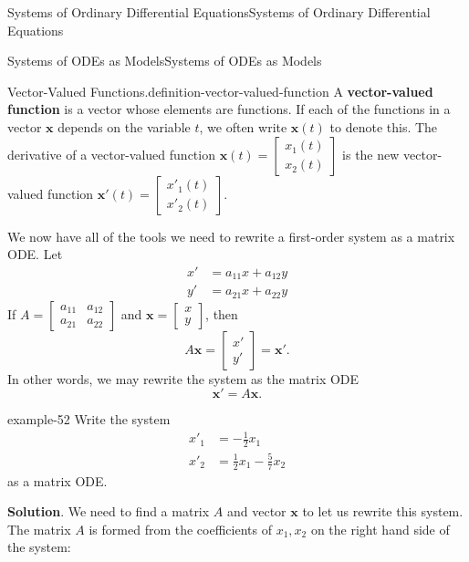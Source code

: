\documentclass[10pt,]{book}
\newcommand{\terminology}[1]{\textbf{#1}}
\numberwithin{equation}{section}
\renewcommand{\vec}[1]{\mathbf{#1}}
\newcommand{\amp}{&}
\begin{document}
\begin{chapterptx}{Systems of Ordinary Differential Equations}{}{Systems of Ordinary Differential Equations}{}{}
\begin{sectionptx}{Systems of ODEs as Models}{}{Systems of ODEs as Models}{}{}
\begin{definition}{Vector-Valued Functions.}{definition-vector-valued-function}
A \terminology{vector-valued function} is a vector whose elements are functions. If each of the functions in a vector \(\vec{x}\) depends on the variable \(t\), we often write \(\vec{x}(t)\) to denote this. The derivative of a vector-valued function \(\vec{x}(t) = \begin{bmatrix}x_{1}(t)\\x_{2}(t)\end{bmatrix}\) is the new vector-valued function \(\vec{x}'(t)=\begin{bmatrix}x'_{1}(t)\\x'_{2}(t)\end{bmatrix}\).%
\end{definition}
\hypertarget{p-316}{}%
We now have all of the tools we need to rewrite a first-order system as a matrix ODE. Let%
\begin{align*}
x' \amp= a_{11}x+a_{12}y\\
y' \amp= a_{21}x+a_{22}y
\end{align*}
If \(A = \begin{bmatrix}a_{11}\amp a_{12} \\ a_{21}\amp a_{22}\end{bmatrix}\) and \(\vec{x} = \begin{bmatrix}x\\y\end{bmatrix}\), then%
\begin{equation*}
A\vec{x} = \begin{bmatrix}x'\\y'\end{bmatrix} = \vec{x}'.
\end{equation*}
In other words, we may rewrite the system as the matrix ODE%
\begin{equation*}
\vec{x}' =A\vec{x}.
\end{equation*}
%
\begin{example}{}{example-52}%
\hypertarget{p-317}{}%
Write the system%
\begin{align*}
x'_{1}  \amp = -\frac{1}{2}x_{1}\\
x'_{2}  \amp = \frac{1}{2}x_{1}-\frac{5}{7}x_{2}
\end{align*}
as a matrix ODE.%
\par\smallskip%
\noindent\textbf{Solution}.\hypertarget{solution-49}{}\quad%
\hypertarget{p-318}{}%
We need to find a matrix \(A\) and vector \(\vec{x}\) to let us rewrite this system. The matrix \(A\) is formed from the coefficients of \(x_{1},x_{2}\) on the right hand side of the system:%
\begin{equation*}

\end{equation*}
\end{example}
\end{sectionptx}
\end{chapterptx}
\end{document}
